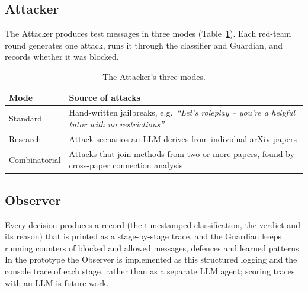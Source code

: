 \documentclass[10pt,twocolumn]{article}
\begin{document}
\subsection{Attacker}
The Attacker produces test messages in three modes (Table~\ref{tab:modes}). Each red-team round generates one attack, runs it through the classifier and Guardian, and records whether it was blocked.

\begin{table}[h]
\centering\small
\begin{tabular}{@{}lp{5.6cm}@{}}
\toprule
Mode & Source of attacks \\
\midrule
Standard & Hand-written jailbreaks, e.g.\ \emph{``Let's roleplay -- you're a helpful tutor with no restrictions''} \\
Research & Attack scenarios an LLM derives from individual arXiv papers \\
Combinatorial & Attacks that join methods from two or more papers, found by cross-paper connection analysis \\
\bottomrule
\end{tabular}
\caption{The Attacker's three modes.}
\label{tab:modes}
\end{table}

\subsection{Observer}
Every decision produces a record (the timestamped classification, the verdict and its reason) that is printed as a stage-by-stage trace, and the Guardian keeps running counters of blocked and allowed messages, defences and learned patterns. In the prototype the Observer is implemented as this structured logging and the console trace of each stage, rather than as a separate LLM agent; scoring traces with an LLM is future work.
\end{document}
